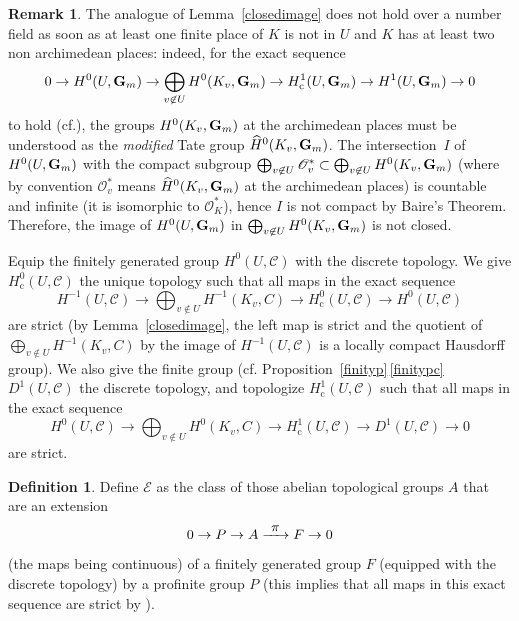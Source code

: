 \documentclass[11pt]{article}
\newcommand{\cf}{cf.\xspace}
\let\mathcal\mathscr
\newcommand\To[1]{\mathchoice{\xrightarrow{\textstyle\kern4pt#1\kern3pt}}{\stackrel{#1}{\longrightarrow}}{}{}}
\newcommand{\rc}{\mathrm{c}}
\theoremstyle{plain}
\theoremstyle{definition}
\newtheorem{defi}[theo]{Definition}
\newtheorem{rema}[theo]{Remark}
\newcommand\cO {\mathcal{O}}
\newcommand \cC {\mathcal{C}}
\begin{document}
\begin{rema} \label{nocdn}
The analogue of Lemma~\ref{closedimage} does not hold over a number field
as soon as at least one finite place of $K$ is not in $U$ and $K$ has at
least two non archimedean places: indeed, for the exact sequence\vspace*{-3pt}
\[
0 \to H^0(U,\G) \to \bigoplus_{v \not \in U} H^0(K_v,\G) \to
H^1_\rc(U,\G) \to H^1(U,\G) \to 0
\]
to hold (\cf \cite[beginning of \S 2]{DemH}),
the groups $H^0(K_v,\mathbf{G}_m)$ at the archimedean places
must be understood as the \emph{modified} Tate group ${\widehat H}^0(K_v,\mathbf{G}_m)$.
The intersection~$I$ of~$H^0(U,\mathbf{G}_m)$ with
the compact subgroup
$\bigoplus_{v \not \in U} \cO_v^* \subset
\bigoplus_{v \not \in U} H^0(K_v,\G) $ (where by convention $\cO_v^*$
means ${\widehat H}^0(K_v,\mathbf{G}_m)$ at the archimedean places) is countable
and infinite (it is isomorphic to $\cO_K^*$),
hence $I$ is not compact by Baire's Theorem.
Therefore, the image of $H^0(U,\mathbf{G}_m)$ in $\bigoplus_{v \not \in U} H^0(K_v,\mathbf{G}_m)$
is not closed.
\end{rema}

Equip the finitely generated group $H^0(U,\cC)$ with the discrete
topology. We give $H^0_\rc(U, \cC)$ the unique topology such that all maps in
the exact sequence
\begin{equation} \label {toph0c}
H^{-1}(U,\cC)
\to \bigoplus_{v \not \in U} H^{-1}(K_v,C) \to H^0_\rc(U, \cC) \to H^0(U,\cC)
\end{equation}
are strict (by Lemma~\ref{closedimage}, the left map is strict and the
quotient of $\bigoplus_{v \not \in U} H^{-1}(K_v,C)$ by the image of
$H^{-1}(U,\cC)$ is a locally compact Hausdorff group).
We also give the finite group (\cf Proposition~\ref{finityp}\,\eqref{finitypc}
$D^1(U,\cC)$ the discrete topology, and topologize $H^1_\rc(U,\cC)$ such that
all maps in the exact sequence
\begin{equation} \label {toph1c}
H^0(U,\cC) \to \bigoplus_{v \not \in U} H^0(K_v,C) \to H^1_\rc(U, \cC) \to D^1(U,\cC) \to 0
\end{equation}
are strict.

\begin{defi}
Define ${\mathcal E}$ as the class of those abelian topological groups
$A$ that are an extension
\begin{equation} \label{extgroup}
0 \to P \to A \To{\pi}F \to 0
\end{equation}
(the maps being continuous)
of a finitely generated group $F$ (equipped with the
discrete topology) by a profinite group $P$ (this implies that all maps
in this exact sequence are strict by \cite[Lem.\,3.4]{DemH}).
\end{defi}
\end{document}
